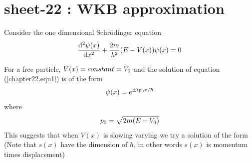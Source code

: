 
\chapter{sheet-22 : WKB approximation}
\ifpdf
\graphicspath{{Chapter22/figs/}}
\else
\graphicspath{{Chapter22/figs/}}
\fi



Consider the one dimensional Schr\"{o}dinger equation
\begin{align}
	\dv[2]{\psi\qty(x)}{x} + \frac{2 m}{\hbar^2} \qty(E - V(x)) \psi\qty(x) = 0
	\label{chapter22.eqn1}
\end{align}

For a free particle, $V\qty(x) = constant = V_0$ and the solution of equation (\ref{chapter22.eqn1}) is of the form
\begin{equation}
	\psi\qty(x) = e^{\pm {i\mkern1mu} p_0 x / \hbar}
	\label{chapter22.eqn2}
\end{equation}
where
\begin{equation}
	p_0 = \sqrt{2 m \qty(E - V_0)}
	\label{chapter22.eqn3}
\end{equation}
This suggests that when $V(x)$ is  slowing varying we try a solution of the form (Note that $s(x)$ have the dimension of $\hbar$, in other words $s(x)$ is momentum times displacement)

